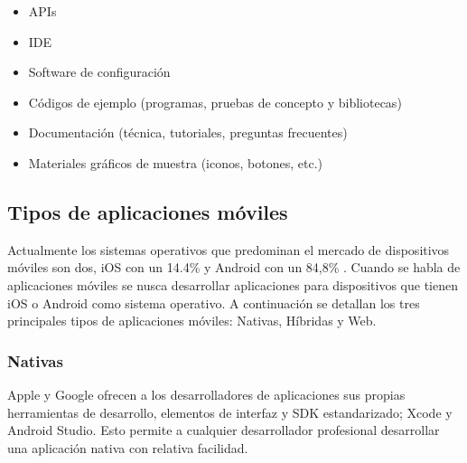 \begin{itemize}
\item APIs
\item IDE
\item Software de configuración
\item Códigos de ejemplo (programas, pruebas de concepto y bibliotecas)
\item Documentación (técnica, tutoriales, preguntas frecuentes)
\item Materiales gráficos de muestra (iconos, botones, etc.)
\end{itemize}




\subsection{Tipos de aplicaciones móviles}
Actualmente los sistemas operativos que predominan el mercado de dispositivos móviles son dos, iOS con un 14.4\% y Android con un 84,8\%  \citep{statista-SO-war-mobile}. Cuando se habla de aplicaciones móviles se nusca desarrollar aplicaciones para dispositivos que tienen iOS o Android como sistema operativo. A continuación se detallan los tres principales tipos de aplicaciones móviles: Nativas, Híbridas y Web.




	\subsubsection{Nativas}
	Apple y Google ofrecen a los desarrolladores de aplicaciones sus propias herramientas de desarrollo, elementos de interfaz y SDK estandarizado; Xcode y Android Studio. Esto permite a cualquier desarrollador profesional desarrollar una aplicación nativa con relativa facilidad.
	
